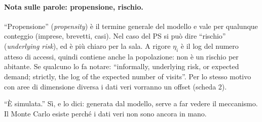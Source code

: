 \documentclass[11pt,a4paper]{article}
\begin{document}
\paragraph{Nota sulle parole: propensione, rischio.} ``Propensione'' (\emph{propensity}) è il termine generale del modello e vale per qualunque conteggio (imprese, brevetti, casi). Nel caso del PS si può dire ``rischio'' (\emph{underlying risk}), ed è più chiaro per la sala. A rigore $\eta_i$ è il log del numero atteso di accessi, quindi contiene anche la popolazione: non è un rischio per abitante. Se qualcuno lo fa notare: ``informally, underlying risk, or expected demand; strictly, the log of the expected number of visits''. Per lo stesso motivo con aree di dimensione diversa i dati veri vorranno un offset (scheda 2).
\begin{warn}
``\`E simulata.'' Sì, e lo dici: generata dal modello, serve a far vedere il meccanismo. Il Monte Carlo esiste perché i dati veri non sono ancora in mano.
\end{warn}
\end{document}
